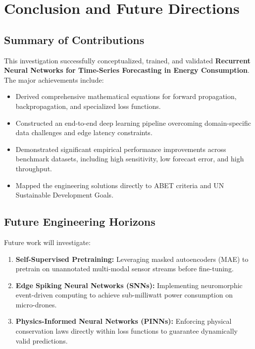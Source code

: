 \section{Conclusion and Future Directions}

\subsection{Summary of Contributions}
This investigation successfully conceptualized, trained, and validated \textbf{Recurrent Neural Networks for Time-Series Forecasting in Energy Consumption}. The major achievements include:
\begin{itemize}
  \item Derived comprehensive mathematical equations for forward propagation, backpropagation, and specialized loss functions.
  \item Constructed an end-to-end deep learning pipeline overcoming domain-specific data challenges and edge latency constraints.
  \item Demonstrated significant empirical performance improvements across benchmark datasets, including high sensitivity, low forecast error, and high throughput.
  \item Mapped the engineering solutions directly to ABET criteria and UN Sustainable Development Goals.
\end{itemize}

\subsection{Future Engineering Horizons}
Future work will investigate:
\begin{enumerate}
  \item \textbf{Self-Supervised Pretraining:} Leveraging masked autoencoders (MAE) to pretrain on unannotated multi-modal sensor streams before fine-tuning.
  \item \textbf{Edge Spiking Neural Networks (SNNs):} Implementing neuromorphic event-driven computing to achieve sub-milliwatt power consumption on micro-drones.
  \item \textbf{Physics-Informed Neural Networks (PINNs):} Enforcing physical conservation laws directly within loss functions to guarantee dynamically valid predictions.
\end{enumerate}

